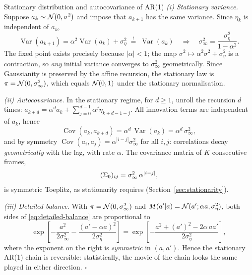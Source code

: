 \begin{toolbox}[tb:ar1]{Stationary distribution and autocovariance of AR(1)}
\emph{(i) Stationary variance.} Suppose $a_k \sim \mathcal{N}(0, \sigma^2)$ and
impose that $a_{k+1}$ has the same variance. Since $\eta_k$ is
independent of $a_k$,
\begin{equation*}
  \operatorname{Var}(a_{k+1})
  = \alpha^2 \operatorname{Var}(a_k) + \sigma_\eta^2
  \;\stackrel{!}{=}\; \operatorname{Var}(a_k)
  \quad\Longrightarrow\quad
  \sigma_\infty^2 = \frac{\sigma_\eta^2}{1 - \alpha^2}.
\end{equation*}
The fixed point exists precisely because $|\alpha| < 1$; the map
$\sigma^2 \mapsto \alpha^2 \sigma^2 + \sigma_\eta^2$ is a contraction, so
\emph{any} initial variance converges to $\sigma_\infty^2$ geometrically.
Since Gaussianity is preserved by the affine recursion, the stationary
law is $\pi = \mathcal{N}(0, \sigma_\infty^2)$, which equals $\mathcal{N}(0,1)$ under the
stationary normalisation.

\emph{(ii) Autocovariance.} In the stationary regime, for $d \geq 1$,
unroll the recursion $d$ times:
$a_{k+d} = \alpha^d a_k + \sum_{j=0}^{d-1} \alpha^{j} \eta_{k+d-1-j}$.
All innovation terms are independent of $a_k$, hence
\begin{equation*}
  \operatorname{Cov}(a_k, a_{k+d})
  = \alpha^d\, \operatorname{Var}(a_k)
  = \alpha^d\, \sigma_\infty^2 ,
\end{equation*}
and by symmetry
$\operatorname{Cov}(a_i, a_j) = \alpha^{|i-j|} \sigma_\infty^2$ for all
$i, j$: correlations decay \emph{geometrically} with the lag, with rate
$\alpha$. The covariance matrix of $K$ consecutive frames,
\begin{equation*}
  (\Sigma_0)_{ij} = \sigma_\infty^2\, \alpha^{|i-j|},
\end{equation*}
is symmetric Toeplitz, as stationarity requires
(Section~\ref{sec:stationarity}).

\emph{(iii) Detailed balance.} With $\pi = \mathcal{N}(0, \sigma_\infty^2)$ and
$M(a'|a) = \mathcal{N}(a'; \alpha a, \sigma_\eta^2)$, both sides of
\eqref{eq:detailed-balance} are proportional to
\begin{equation*}
  \exp\!\left[
    -\frac{a^2}{2\sigma_\infty^2}
    -\frac{(a' - \alpha a)^2}{2\sigma_\eta^2}
  \right]
  = \exp\!\left[
    -\frac{a^2 + (a')^2 - 2\alpha\, a a'}{2\sigma_\eta^2}
  \right],
\end{equation*}
where the exponent on the right is \emph{symmetric} in $(a, a')$. Hence
the stationary AR(1) chain is reversible: statistically, the movie of the
chain looks the same played in either direction. \hfill$\square$
\end{toolbox}

